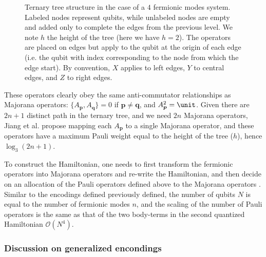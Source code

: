 \begin{figure} [h]
\begin{tikzpicture}[
    shorten > = 1pt,
node distance = 3cm and 4cm,
    el/.style = {inner sep=2pt, align=left, sloped},
every label/.append style = {font=\tiny}
                    ]
\end{tikzpicture}
\caption{Ternary tree structure in the case of a $4$ fermionic modes system. Labeled nodes represent qubits, while unlabeled nodes are empty and added only to complete the edges from the previous level. We note $h$ the height of the tree (here we have $h=2$). The operators are placed on edges but apply to the qubit at the origin of each edge (i.e. the qubit with index corresponding to the node from which the edge start). By convention, $X$ applies to left edges, $Y$ to central edges, and $Z$ to right edges.}
\label{fig:ternary_tree}
\end{figure}

These operators clearly obey the same anti-commutator relationships as Majorana operators: $\{ A_{\boldsymbol{p}}, A_{\boldsymbol{q}}\}= 0$ if $\boldsymbol{p} \neq \boldsymbol{q}$, and $ A_{\boldsymbol{p}}^2 = \unit$. Given there are $2n + 1$ distinct path in the ternary tree, and we need $2n$ Majorana operators, Jiang et al. \cite{Jiang2020} propose mapping each $A_{\boldsymbol{p}}$ to a single Majorana operator, and these operators have a maximum Pauli weight equal to the height of the tree ($h$), hence $\log_3(2n + 1)$. 

To construct the Hamiltonian, one needs to first transform the fermionic operators into Majorana operators and re-write the Hamiltonian, and then decide on an allocation of the Pauli operators defined above to the Majorana operators \cite{Jiang2020}. Similar to the encodings defined previously defined, the number of qubits $N$ is equal to the number of fermionic modes $n$, and the scaling of the number of Pauli operators is the same as that of the two body-terms in the second quantized Hamiltonian $\mathcal{O}(N^4)$.


\subsubsection{Discussion on generalized encondings}

